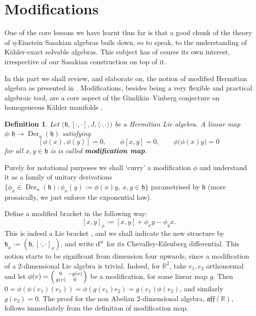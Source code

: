 \documentclass[12pt, twoside]{amsart}
\def\D{\textup{d}}
\def\h{\mathfrak{h}}
\def\R{\mathbb{R}}
\def\aff{\mathfrak{aff}}
\def\pint{\langle \cdotp,\cdotp \rangle }
\newcommand{\op}[1]{\operatorname{#1}}
\newenvironment{spmatrix}{\left(\smallmatrix}{\endsmallmatrix\right)}
\newtheorem{definition}{\bf Definition}[section]
\theoremstyle{definition}
\begin{document}
\section{Modifications}

One of the core lessons we have learnt thus far is that a good chunk of the theory of $\eta$-Einstein Sasakian algebras boils down, so to speak, to the understanding of K{\"a}hler-exact solvable algebras. This subject has of course its own interest, irrespective of our Sasakian construction on top of it. 

In this part we shall review, and elaborate on, the notion of modified Hermitian algebra as presented in \cite{Dorf, Dalek-Keizo-Kamishima}. 
Modifications, besides being a very flexible and practical algebraic tool, are a core aspect of the Gindikin--Vinberg conjecture on homogeneous K\"ahler manifolds \cite{Dorfmeister-Nakajima}.


\begin{definition} \label{def modi}
Let $\big(\h,[\cdot,\cdot ], J, \pint\big)$ be a Hermitian Lie algebra. A linear map 
 $\phi: \h \to \op{Der}_{u}( \h)$ satisfying 
$$[\phi(x), \phi(y)]=0, \qquad \phi [x,y]=0, \qquad \phi\big(\phi(x)y\big)=0$$
for all $x,y \in \h$ is  is called {\bf modification map}.
\end{definition}
Purely for notational purposes we shall `curry' a modification $\phi$ and understand it as a family of unitary derivations $\big\{\phi_x \in\op{Der}_u(\h)\colon \phi_x(y):=\phi(x)y,\ x, y\in \h\big\}$ parametrised by $\h$ (more prosaically, we just enforce the exponential law).
\smallbreak

 Define a modified bracket in the following way:
\[[x,y]_{\phi}:=[x,y]+\phi_xy-\phi_y x.\]
This is indeed a Lie bracket \cite[Proposition 5]{Cortes}, and we shall indicate the new structure by $\h_{\phi}:=(\h,[ \cdot , \cdot]_{\phi})$, and write $\D^\phi$ for its Chevalley-Eilenberg differential.
\medbreak
This notion starts to be significant from dimension four upwards, since a modification of a 2-dimensional Lie algebra is trivial. Indeed, for $\R^2$, take $e_1, e_2$ orthonormal  and let $\phi(v)=
    \begin{spmatrix} 0 & -g(v)\\ g(v) & 0  \end{spmatrix}$ 
be a modification, for some linear map $g$. Then $0= \phi(\phi(e_1)(e_1))=\phi(g(e_1)e_2)=g(e_1)\phi(e_2)$, and similarly $g(e_2)=0$. The proof for the non Abelian $2$-dimensional algebra, $\aff(\R)$, follows immediately from the definition of modification map.
     
\end{document}
